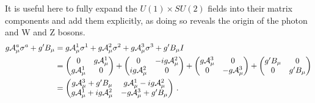     It is useful here to fully expand the $U(1) \times SU(2)$ fields into their matrix components and add them explicitly,
        as doing so reveals the origin of the photon and W and Z bosons.
    \begin{equation} \begin{split}
        g \mathcal{A}^a_{\mu} \sigma^a + g' B_{\mu} & =
            g \mathcal{A}^1_{\mu} \sigma^1
            + g \mathcal{A}^2_{\mu} \sigma^2
            + g \mathcal{A}^3_{\mu} \sigma^3
            + g' B_{\mu} I \\
        & = \begin{pmatrix}
            0 & g\mathcal{A}^1_{\mu} \\ g\mathcal{A}^1_{\mu} & 0 \end{pmatrix}
            + \begin{pmatrix} 0 & -ig\mathcal{A}^2_{\mu} \\ ig\mathcal{A}^2_{\mu} & 0 \end{pmatrix}
            + \begin{pmatrix} g\mathcal{A}^3_{\mu} & 0 \\ 0 & -g\mathcal{A}^3_{\mu} \end{pmatrix}
            + \begin{pmatrix} g'B_{\mu} & 0 \\ 0 & g'B_{\mu}
        \end{pmatrix} \\
        & = \begin{pmatrix} 
            g\mathcal{A}^3_{\mu} + g'B_{\mu} & g\mathcal{A}^1_{\mu} - ig\mathcal{A}^2_{\mu} \\
            g\mathcal{A}^1_{\mu} + ig\mathcal{A}^2_{\mu} & -g\mathcal{A}^3_{\mu} + g'B_{\mu}
        \end{pmatrix}
        \,.
    \end{split} \end{equation}

